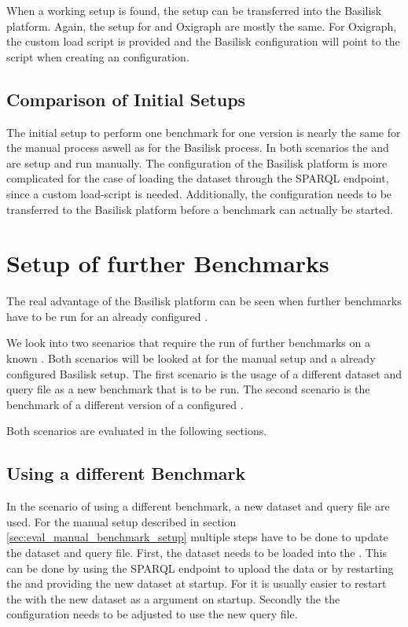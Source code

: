When a working setup is found, the setup can be transferred into the Basilisk platform.
Again, the setup for \tentris{} and Oxigraph are mostly the same.
For Oxigraph, the custom load script is provided and the Basilisk configuration will point to the script when creating an \iguana{} configuration.



\subsection{Comparison of Initial Setups}
The initial setup to perform one benchmark for one \ts{} version is nearly the same for the manual process aswell as for the Basilisk process.
In both scenarios the \ts{} and \iguana{} are setup and run manually.
The configuration of the Basilisk platform is more complicated for the case of loading the dataset through the SPARQL endpoint, since a custom load-script is needed.
Additionally, the configuration needs to be transferred to the Basilisk platform before a benchmark can actually be started.


\section{Setup of further Benchmarks}
The real advantage of the Basilisk platform can be seen when further benchmarks have to be run for an already configured \ts{}.

We look into two scenarios that require the run of further benchmarks on a known \ts{}.
Both scenarios will be looked at for the manual setup and a already configured Basilisk setup.
The first scenario is the usage of a different dataset and query file as a new benchmark that is to be run.
The second scenario is the benchmark of a different version of a configured \ts{}.

Both scenarios are evaluated in the following sections.


\subsection{Using a different Benchmark}
In the scenario of using a different benchmark, a new dataset and query file are used.
For the manual setup described in section \ref{sec:eval_manual_benchmark_setup} multiple steps have to be done to update the dataset and query file.
First, the dataset needs to be loaded into the \ts{}.
This can be done by using the SPARQL endpoint to upload the data or by restarting the \ts{} and providing the new dataset at startup.
For \tentris{} it is usually easier to restart the \ts{} with the new dataset as a argument on startup.
Secondly the the \iguana{} configuration needs to be adjusted to use the new query file.
\\

